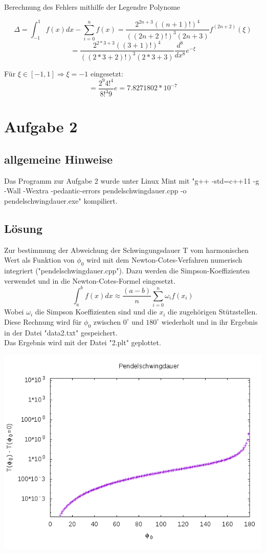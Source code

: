 \documentclass{scrreprt}
\begin{document}
Berechnung des Fehlers mithilfe der Legendre Polynome

\[
\Delta = \int_{-1}^{1}f(x)dx - \sum_{i=0}^{n}f(x) = \frac{2^{2n+3}((n+1)!)^4}{((2n+2)!)^3(2n+3)}f^{(2n+2)}(\xi)
\]
\[
=\frac{2^{2*3+3}((3+1)!)^4}{((2*3+2)!)^3(2*3+3)}\frac{d^8}{dx^8}e^{-\xi}
\]

Für $\xi \in [-1,1] \Rightarrow \xi=-1$ eingesetzt:
\[
=\frac{2^9 4!^4}{8!^3 9} e = 7.8271802*10^{-7}
\]

\chapter*{Aufgabe 2}
\section*{allgemeine Hinweise}
Das Programm zur Aufgabe 2 wurde unter Linux Mint mit "g++ -std=c++11 -g -Wall -Wextra -pedantic-errors pendelschwingdauer.cpp -o pendelschwingdauer.exe" kompiliert.

\section*{Lösung}
Zur bestimmung der Abweichung der Schwingungsdauer T vom harmonischen Wert als Funktion von $\phi_0$ wird mit dem Newton-Cotes-Verfahren numerisch integriert ("pendelschwingdauer.cpp").
Dazu werden die Simpson-Koeffizienten verwendet und in die Newton-Cotes-Formel eingesetzt. 
\[
\int_{a}^{b}f(x)dx \approx \frac{(a-b)}{n} \sum_{i=0}^{n} \omega_i f(x_i) 
\]
Wobei $\omega_i$ die Simpson Koeffizienten sind und die $x_i$ die zugehörigen Stützstellen. Diese Rechnung wird für $\phi_0$ zwischen $0^\circ$ und $180^\circ$ wiederholt und in ihr Ergebnis in der Datei "data2.txt" gespeichert.\\
Das Ergebnis wird mit der Datei "2.plt" geplottet.
\begin{center}
	\includegraphics[scale=0.6]{2.png}
\end{center}
\end{document}
